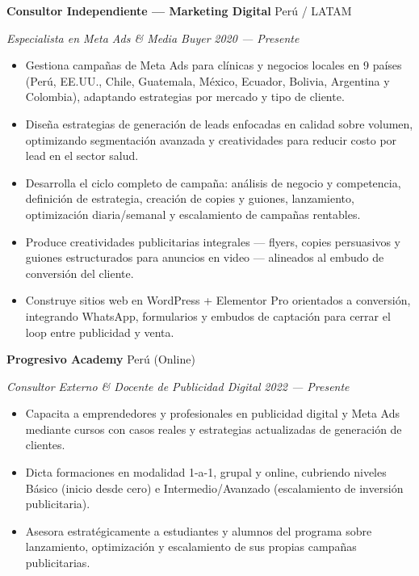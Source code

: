 \documentclass[11pt,letterpaper]{article}
\newcommand{\entry}[4]{%
  \noindent\textbf{#1} \hfill #2 \par\nopagebreak
  \textit{#3} \hfill \textit{#4} \par\nopagebreak
}
\begin{document}
\entry{Consultor Independiente --- Marketing Digital}{Perú / LATAM}{Especialista en Meta Ads \& Media Buyer}{2020 --- Presente}
\begin{itemize}
  \item Gestiona campañas de Meta Ads para clínicas y negocios locales en 9 países (Perú, EE.UU., Chile, Guatemala, México, Ecuador, Bolivia, Argentina y Colombia), adaptando estrategias por mercado y tipo de cliente.
  \item Diseña estrategias de generación de leads enfocadas en calidad sobre volumen, optimizando segmentación avanzada y creatividades para reducir costo por lead en el sector salud.
  \item Desarrolla el ciclo completo de campaña: análisis de negocio y competencia, definición de estrategia, creación de copies y guiones, lanzamiento, optimización diaria/semanal y escalamiento de campañas rentables.
  \item Produce creatividades publicitarias integrales --- flyers, copies persuasivos y guiones estructurados para anuncios en video --- alineados al embudo de conversión del cliente.
  \item Construye sitios web en WordPress + Elementor Pro orientados a conversión, integrando WhatsApp, formularios y embudos de captación para cerrar el loop entre publicidad y venta.
\end{itemize}
\vspace{0.3em}

\entry{Progresivo Academy}{Perú (Online)}{Consultor Externo \& Docente de Publicidad Digital}{2022 --- Presente}
\begin{itemize}
  \item Capacita a emprendedores y profesionales en publicidad digital y Meta Ads mediante cursos con casos reales y estrategias actualizadas de generación de clientes.
  \item Dicta formaciones en modalidad 1-a-1, grupal y online, cubriendo niveles Básico (inicio desde cero) e Intermedio/Avanzado (escalamiento de inversión publicitaria).
  \item Asesora estratégicamente a estudiantes y alumnos del programa sobre lanzamiento, optimización y escalamiento de sus propias campañas publicitarias.
\end{itemize}
\vspace{0.3em}
\end{document}
